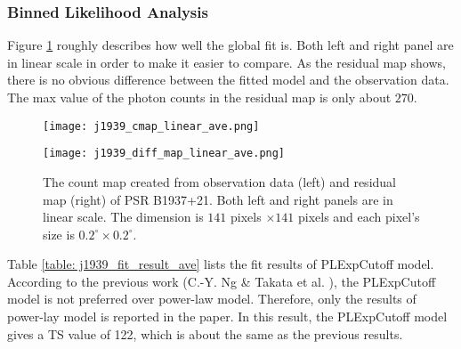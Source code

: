 \documentclass[12pt]{report}
\begin{document}
      \subsubsection{Binned Likelihood Analysis}
        Figure \ref{fig: j1939_count_map_diff_ave} roughly describes how well the global fit 
        is. Both left and right panel are in linear scale in order to make it easier to 
        compare. As the residual map shows, there is no obvious difference between the fitted 
        model and the observation data. The max value of the photon counts in the residual map 
        is only about $270$. 
        \begin{figure}[!ht]
          \begin{center}
          \begin{minipage}{0.45\textwidth}
            \begin{center} 
              \texttt{[image: j1939\_cmap\_linear\_ave.png]}
            \end{center}
          \end{minipage}
          \begin{minipage}{0.45\textwidth}
            \begin{center}
              \texttt{[image: j1939\_diff\_map\_linear\_ave.png]}
            \end{center}
          \end{minipage}
          \end{center}
            \caption{The count map created from observation data (left) and residual map (right)
              of PSR B1937+21. Both left and right panels are in linear scale. 
              The dimension is $141$ pixels $\times 141$ pixels and each pixel's 
              size is $0.2^{\circ}\times0.2^{\circ}$.}
            \label{fig: j1939_count_map_diff_ave}
        \end{figure}

        Table \ref{table: j1939_fit_result_ave} lists the fit results of PLExpCutoff model. 
        According to the previous work (C.-Y. Ng \& Takata et al. \cite{0004-637X-787-2-167}), 
        the PLExpCutoff model is not 
        preferred over power-law model. Therefore, only the results of power-lay model is 
        reported in the paper. In this result, the PLExpCutoff model gives a TS value of 122,
        which is about the same as the previous results. 
\end{document}
